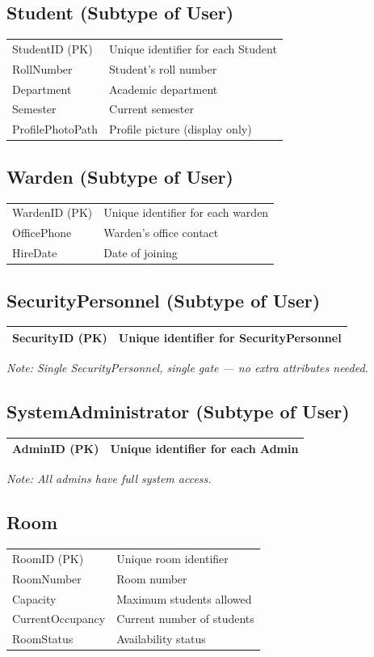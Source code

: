 \documentclass[12pt,a4paper]{article}
\begin{document}
\subsection{Student (Subtype of User)}
\begin{longtable}{|p{4cm}|p{8cm}|}
\hline
StudentID (PK) & Unique identifier for each Student \\
RollNumber & Student's roll number \\
Department & Academic department \\
Semester & Current semester \\
ProfilePhotoPath & Profile picture (display only) \\
\hline
\end{longtable}

\subsection{Warden (Subtype of User)}
\begin{longtable}{|p{4cm}|p{8cm}|}
\hline
WardenID (PK) & Unique identifier for each warden \\
OfficePhone & Warden's office contact \\
HireDate & Date of joining \\
\hline
\end{longtable}

\subsection{SecurityPersonnel (Subtype of User)}
\begin{longtable}{|p{4cm}|p{8cm}|}
\hline
SecurityID (PK) & Unique identifier for SecurityPersonnel\\
\hline
\end{longtable}
\textit{Note: Single SecurityPersonnel, single gate — no extra attributes needed.}

\subsection{SystemAdministrator (Subtype of User)}
\begin{longtable}{|p{4cm}|p{8cm}|}
\hline
AdminID (PK) & Unique identifier for each Admin \\
\hline
\end{longtable}
\textit{Note: All admins have full system access.}

\newpage
\subsection{Room}
\begin{longtable}{|p{4cm}|p{8cm}|}
\hline
RoomID (PK) & Unique room identifier \\
RoomNumber & Room number \\
Capacity & Maximum students allowed \\
CurrentOccupancy & Current number of students \\
RoomStatus & Availability status \\
\hline
\end{longtable}
\end{document}

